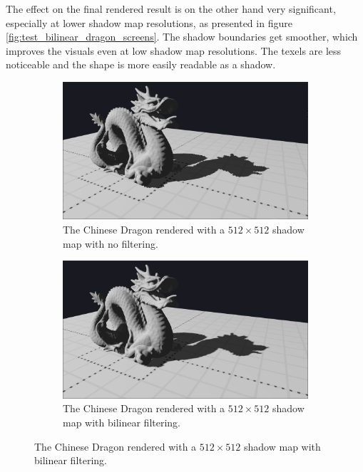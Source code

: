 The effect on the final rendered result is on the other hand very significant, especially at lower shadow map resolutions, as presented in figure \ref{fig:test_bilinear_dragon_screens}. The shadow boundaries get smoother, which improves the visuals even at low shadow map resolutions. The texels are less noticeable and the shape is more easily readable as a shadow.

\begin{figure}[h]
    \centering
    \begin{subfigure}[t]{0.48\textwidth}
		\centering
        \includegraphics[width=\textwidth]{./graf/tests/basic/cropped/dragon_basic_fhd_512.png}
        \caption{The Chinese Dragon rendered with a \(512\times 512\) shadow map with no filtering.}
    \end{subfigure}
	\hfill
    \begin{subfigure}[t]{0.48\textwidth}
		\centering
        \includegraphics[width=\textwidth]{./graf/tests/bilinear/cropped/dragon_bilinear_fhd_512.png}
        \caption{The Chinese Dragon rendered with a \(512\times 512\) shadow map with bilinear filtering.}
    \end{subfigure}

\end{figure}
